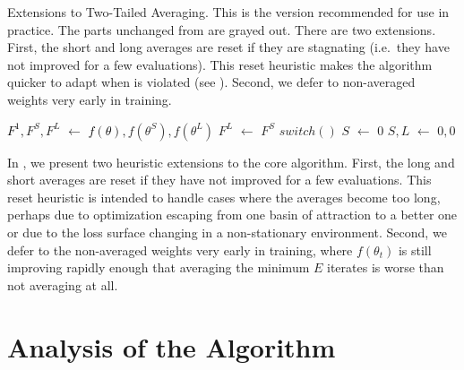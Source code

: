 \documentclass[twocolumn]{article}
\newcommand*\Let[2]{\State #1 $\gets$ #2}
\begin{document}
\begin{algorithm}[t]
  \caption[Extensions to Two-Tailed Averaging.]{\small Extensions to Two-Tailed Averaging.
This is the version recommended for use in practice.
The parts unchanged from  are grayed out.
There are two extensions.
First, the short and long averages are reset if they are stagnating (i.e.\  they have not improved for a few evaluations).
This reset heuristic makes the algorithm quicker to adapt when  is violated (see ).
Second, we defer to non-averaged weights very early in training.}
  \label{alg:two-tailed-averaging-with-extensions}
  \begin{algorithmic}[1]
    \color{gray!80}
      \Let{\textcolor{black}{$F^1,$}$F^S,F^L$}
          {\textcolor{black}{$f(\theta),$}$f(\theta^S),f(\theta^L)$}
        \Let{$F^L$}{$F^S$}
        \State $switch()$
      \color{black}
        \Let{$S$}{$0$}
      \EndIf
          \Let{$S,L$}{$0,0$}
        \EndIf
        \State {}
      \EndIf
      \color{gray!80}
      \State {}
    \EndFunction
  \end{algorithmic}
\end{algorithm}

In , we present two heuristic extensions to the core algorithm.
First, the long and short averages are reset if they have not improved for a few evaluations.
This reset heuristic is intended to handle cases where the averages become too long, perhaps due to optimization escaping from one basin of attraction to a better one or due to the loss surface changing in a non-stationary environment.
Second, we defer to the non-averaged weights very early in training, where $f(\theta_t)$ is still improving rapidly enough that averaging the minimum $E$ iterates is worse than not averaging at all.


\section{Analysis of the Algorithm}
\label{sec:tta-analysis}
\end{document}
